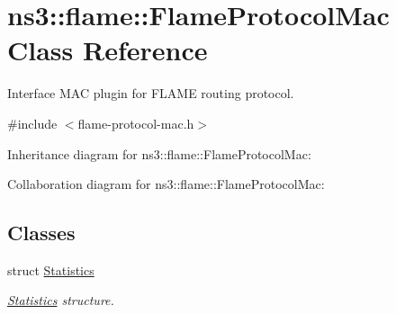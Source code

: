 \hypertarget{classns3_1_1flame_1_1FlameProtocolMac}{}\section{ns3\+:\+:flame\+:\+:Flame\+Protocol\+Mac Class Reference}
\label{classns3_1_1flame_1_1FlameProtocolMac}


Interface M\+AC plugin for F\+L\+A\+ME routing protocol.  




{\ttfamily \#include $<$flame-\/protocol-\/mac.\+h$>$}



Inheritance diagram for ns3\+:\+:flame\+:\+:Flame\+Protocol\+Mac\+:


Collaboration diagram for ns3\+:\+:flame\+:\+:Flame\+Protocol\+Mac\+:
\subsection*{Classes}
\begin{DoxyCompactItemize}
\item 
struct \hyperlink{structns3_1_1flame_1_1FlameProtocolMac_1_1Statistics}{Statistics}
\begin{DoxyCompactList}\small\item\em \hyperlink{structns3_1_1flame_1_1FlameProtocolMac_1_1Statistics}{Statistics} structure. \end{DoxyCompactList}\end{DoxyCompactItemize}

